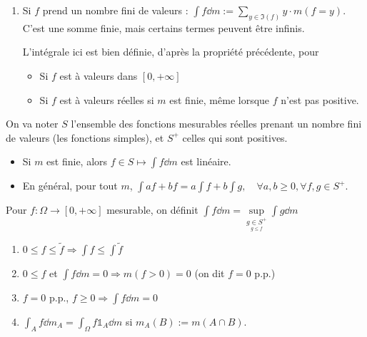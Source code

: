\documentclass[10pt,a4paper,notitlepage ]{report}
\begin{document}
\begin{definition}
	\begin{enumerate}
		\item Si $f$ prend un nombre fini de valeurs : $\int f\dd m := \underset{y\in \Im(f)}{\sum} y\cdot m(f=y)$. C'est une somme finie, mais certains termes peuvent être infinis.
		
		L'intégrale ici est bien définie, d'après la propriété précédente, pour
		\begin{itemize}
			\item Si $f$ est à valeurs dans $[0,+\infty]$
			\item Si $f$ est à valeurs réelles si $m$ est finie, même lorsque $f$ n'est pas positive.
		\end{itemize}
	\end{enumerate}
\end{definition}

On va noter $S$ l'ensemble des fonctions mesurables réelles prenant un nombre fini de valeurs (les fonctions simples), et $S^+$ celles qui sont positives.

\begin{propriete}
	\begin{itemize}
		\item Si $m$ est finie, alors $f\in S \mapsto \int f\dd m$ est linéaire.
		\item En général, pour tout $m$, $\int af + bf = a\int f + b\int g, \quad \forall a,b \ge 0, \forall f,g \in S^+$.
	\end{itemize}
\end{propriete}

\begin{definition}
	Pour $f: \Omega \rightarrow [0,+\infty]$ mesurable, on définit $\int f\dd m = \underset{\underset{g \le f}{g \in S^+}}{\sup} \int g \dd m$
\end{definition}

\begin{propriete}
	\begin{enumerate}
		\item $0 \le f \le \tilde f \Rightarrow \int f \le \int \tilde f$
		\item $0 \le f$ et $\int f \dd m = 0 \Rightarrow m(f>0) = 0$ (on dit $f = 0$ p.p.)
		\item $f=0$ p.p., $f\ge0 \Rightarrow \int f\dd m = 0$
		\item $\int_A f\dd m_A = \int_\Omega f\mathds 1_A \dd m$ si $m_A(B):=m(A\cap B)$.
	\end{enumerate}
\end{propriete}
\end{document}
